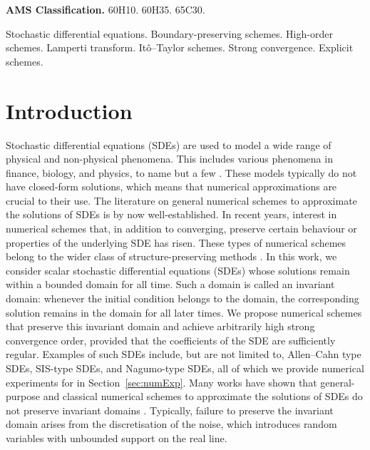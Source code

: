 \documentclass[11pt]{amsart}
\begin{document}
{\small\noindent
{\bf AMS Classification.} 60H10. 60H35. 	65C30.

\bigskip{} Stochastic differential equations. Boundary-preserving schemes. High-order schemes. Lamperti transform. Itô--Taylor schemes. Strong convergence. Explicit schemes.

\vspace{1cm}

\section{Introduction}\label{sec:intro}
Stochastic differential equations (SDEs) are used to model a wide range of physical and non-physical phenomena. This includes various phenomena in finance, biology, and physics, to name but a few \cite{MR3363443,GraySIS, Karlin1981ASC,KERMACK199133, introTostocCalc, MR1214374, MR496534,MR2001996}. These models typically do not have closed-form solutions, which means that numerical approximations are crucial to their use. The literature on general numerical schemes to approximate the solutions of SDEs is by now well-established. In recent years, interest in numerical schemes that, in addition to converging, preserve certain behaviour or properties of the underlying SDE has risen. These types of numerical schemes belong to the wider class of structure-preserving methods \cite{MR2221614}. In this work, we consider scalar stochastic differential equations (SDEs) whose solutions remain within a bounded domain for all time. Such a domain is called an invariant domain: whenever the initial condition belongs to the domain, the corresponding solution remains in the domain for all later times. We propose numerical schemes that preserve this invariant domain and achieve arbitrarily high strong convergence order, provided that the coefficients of the SDE are sufficiently regular. Examples of such SDEs include, but are not limited to, Allen--Cahn type SDEs, SIS-type SDEs, and Nagumo-type SDEs, all of which we provide numerical experiments for in Section~\ref{sec:numExp}. Many works have shown that general-purpose and classical numerical schemes to approximate the solutions of SDEs do not preserve invariant domains \cite{Ulander2024AB,MR4737060}. Typically, failure to preserve the invariant domain arises from the discretisation of the noise, which introduces random variables with unbounded support on the real line. 

}
\end{document}
